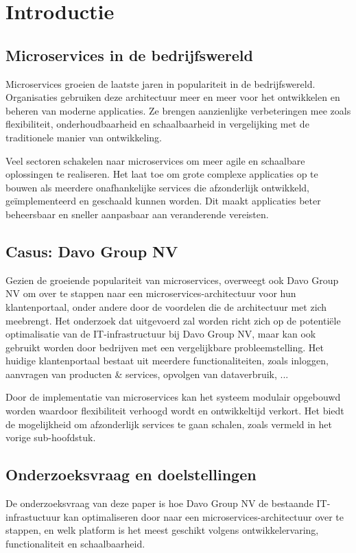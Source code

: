 
\section{Introductie}%
\label{sec:introductie}
\subsection{Microservices in de bedrijfswereld}
Microservices groeien de laatste jaren in populariteit in de bedrijfswereld. Organisaties gebruiken deze architectuur meer en meer voor het ontwikkelen en beheren van moderne applicaties. Ze brengen aanzienlijke verbeteringen mee zoals flexibiliteit, onderhoudbaarheid en schaalbaarheid in vergelijking met de traditionele manier van ontwikkeling.

Veel sectoren schakelen naar microservices om meer agile en schaalbare oplossingen te realiseren. Het laat toe om grote complexe applicaties op te bouwen als meerdere onafhankelijke services die afzonderlijk ontwikkeld, geïmplementeerd en geschaald kunnen worden. Dit maakt applicaties beter beheersbaar en sneller aanpasbaar aan veranderende vereisten.

\subsection{Casus: Davo Group NV}
Gezien de groeiende populariteit van microservices, overweegt ook Davo Group NV om over te stappen naar een microservices-architectuur voor hun klantenportaal, onder andere door de voordelen die de architectuur met zich meebrengt. Het onderzoek dat uitgevoerd zal worden richt zich op de potentiële optimalisatie van de IT-infrastructuur bij Davo Group NV, maar kan ook gebruikt worden door bedrijven met een vergelijkbare probleemstelling. Het huidige klantenportaal bestaat uit meerdere functionaliteiten, zoals inloggen, aanvragen van producten \& services, opvolgen van dataverbruik, ...

Door de implementatie van microservices kan het systeem modulair opgebouwd worden waardoor flexibiliteit verhoogd wordt en ontwikkeltijd verkort. Het biedt de mogelijkheid om afzonderlijk services te gaan schalen, zoals vermeld in het vorige sub-hoofdstuk.

\subsection{Onderzoeksvraag en doelstellingen}
De onderzoeksvraag van deze paper is hoe Davo Group NV de bestaande IT-infrastuctuur kan optimaliseren door naar een microservices-\newline architectuur over te stappen, en welk platform is het meest geschikt volgens ontwikkelervaring, functionaliteit en schaalbaarheid.

